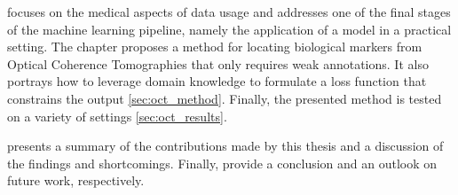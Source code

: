  focuses on the medical aspects of data usage and addresses one of the final stages of the machine learning pipeline, namely the application of a model in a practical setting. The chapter proposes a method for locating biological markers from Optical Coherence Tomographies that only requires weak annotations. It also portrays how to leverage domain knowledge to formulate a loss function that constrains the output \cref{sec:oct_method}. Finally, the presented method is tested on a variety of settings \cref{sec:oct_results}.

 presents a summary of the contributions made by this thesis and a discussion of the findings and shortcomings. Finally,  provide a conclusion  and an outlook on future work, respectively.